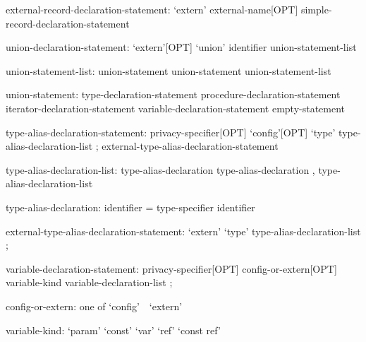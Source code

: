 \begin{syntax}
external-record-declaration-statement:
  `extern' external-name[OPT] simple-record-declaration-statement
\end{syntax}

\begin{syntax}
union-declaration-statement:
  `extern'[OPT] `union' identifier { union-statement-list }
\end{syntax}

\begin{syntax}
union-statement-list:
  union-statement
  union-statement union-statement-list
\end{syntax}

\begin{syntax}
union-statement:
  type-declaration-statement
  procedure-declaration-statement
  iterator-declaration-statement
  variable-declaration-statement
  empty-statement
\end{syntax}

\begin{syntax}
type-alias-declaration-statement:
  privacy-specifier[OPT] `config'[OPT] `type' type-alias-declaration-list ;
  external-type-alias-declaration-statement
\end{syntax}

\begin{syntax}
type-alias-declaration-list:
  type-alias-declaration
  type-alias-declaration , type-alias-declaration-list
\end{syntax}

\begin{syntax}
type-alias-declaration:
  identifier = type-specifier
  identifier
\end{syntax}

\begin{syntax}
external-type-alias-declaration-statement:
  `extern' `type' type-alias-declaration-list ;
\end{syntax}

\begin{syntax}
variable-declaration-statement:
  privacy-specifier[OPT] config-or-extern[OPT] variable-kind variable-declaration-list ;
\end{syntax}

\begin{syntax}
config-or-extern: one of
  `config' $ $ $ $ `extern'
\end{syntax}

\begin{syntax}
variable-kind:
  `param'
  `const'
  `var'
  `ref'
  `const ref'
\end{syntax}

